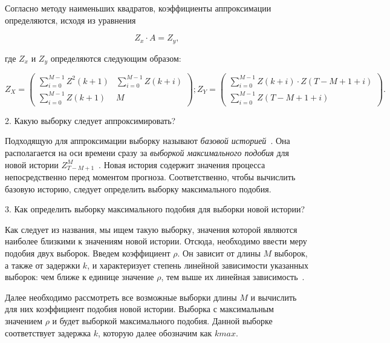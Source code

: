Согласно методу наименьших квадратов, коэффициенты аппроксимации определяются, исходя из уравнения

\begin{equation}
    Z_x \cdot A = Z_y,
\end{equation}

где $Z_x$ и $Z_y$ определяются следующим образом:
\begin{flushright}
\begin{equation}
    Z_X =
\begin{pmatrix}
           \sum_{i=0}^{M-1} Z^2(k+1) & \sum_{i=0}^{M-1} Z(k+i) \\
           \sum_{i=0}^{M-1} Z(k+1)   & M
\end{pmatrix};

    Z_Y =
    \begin{pmatrix}
               \sum_{i=0}^{M-1} Z(k+i) \cdot Z(T-M+1+i) \\
               \sum_{i=0}^{M-1} Z(T-M+1+i)
\end{pmatrix}.{\qquad\qquad }
    \label{eq:equation}
\end{equation}
\end{flushright}

2. Какую выборку следует аппроксимировать?

Подходящую для аппроксимации выборку называют \textit{базовой историей}~\cite{myref9}.
Она располагается на оси времени сразу за \textit{выборкой максимального подобия} для новой истории $Z_{T-M+1}^M$~\cite{myref9}.
Новая история содержит значения процесса непосредственно перед моментом прогноза.
Соответственно, чтобы вычислить базовую историю, следует определить выборку максимального подобия.

3. Как определить выборку максимального подобия для выборки новой истории?

Как следует из названия, мы ищем такую выборку, значения которой являются наиболее близкими к значениям новой истории.
Отсюда, необходимо ввести меру подобия двух выборок.
Введем коэффициент $\rho$.
Он зависит от длины $M$ выборок, а также от задержки $k$, и характеризует степень линейной зависимости указанных выборок:
чем ближе к единице значение $\rho$, тем выше их линейная зависимость~\cite{myref9, myref11}.

Далее необходимо рассмотреть все возможные выборки длины $M$ и вычислить для них коэффициент подобия новой истории.
Выборка с максимальным значением $\rho$ и будет выборкой максимального подобия.
Данной выборке соответствует задержка $k$, которую далее обозначим как $kmax$.


